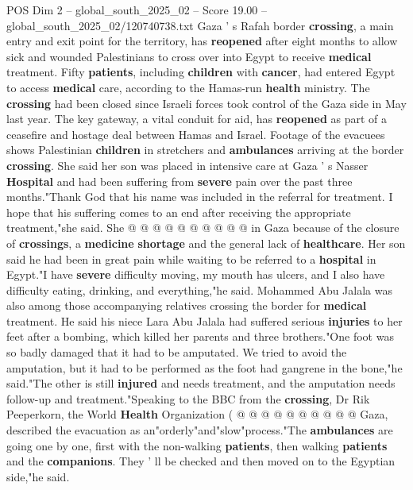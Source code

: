 \begin{textsample}{POS Dim 2 – global\_south\_2025\_02 – Score 19.00 – global\_south\_2025\_02/120740738.txt}  \label{ex:f2_pos_426}
Gaza ' s Rafah border \textbf{crossing}, a main entry and exit point for the territory, has \textbf{reopened} after eight months to allow sick and wounded Palestinians to cross over into Egypt to receive \textbf{medical} treatment.
Fifty \textbf{patients}, including \textbf{children} with \textbf{cancer}, had entered Egypt to access \textbf{medical} care, according to the Hamas-run \textbf{health} ministry.
The \textbf{crossing} had been closed since Israeli forces took control of the Gaza side in May last year.
The key gateway, a vital conduit for aid, has \textbf{reopened} as part of a ceasefire and hostage deal between Hamas and Israel.
Footage of the evacuees shows Palestinian \textbf{children} in stretchers and \textbf{ambulances} arriving at the border \textbf{crossing}.
She said her son was placed in intensive care at Gaza ' s Nasser \textbf{Hospital} and had been suffering from \textbf{severe} pain over the past three months."Thank God that his name was included in the referral for treatment.
I hope that his suffering comes to an end after receiving the appropriate treatment,"she said.
She @ @ @ @ @ @ @ @ @ @ in Gaza because of the closure of \textbf{crossings}, a \textbf{medicine} \textbf{shortage} and the general lack of \textbf{healthcare}.
Her son said he had been in great pain while waiting to be referred to a \textbf{hospital} in Egypt."I have \textbf{severe} difficulty moving, my mouth has ulcers, and I also have difficulty eating, drinking, and everything,"he said.
Mohammed Abu Jalala was also among those accompanying relatives crossing the border for \textbf{medical} treatment.
He said his niece Lara Abu Jalala had suffered serious \textbf{injuries} to her feet after a bombing, which killed her parents and three brothers."One foot was so badly damaged that it had to be amputated.
We tried to avoid the amputation, but it had to be performed as the foot had gangrene in the bone,"he said."The other is still \textbf{injured} and needs treatment, and the amputation needs follow-up and treatment."Speaking to the BBC from the \textbf{crossing}, Dr Rik Peeperkorn, the World \textbf{Health} Organization ( @ @ @ @ @ @ @ @ @ @ Gaza, described the evacuation as an"orderly"and"slow"process."The \textbf{ambulances} are going one by one, first with the non-walking \textbf{patients}, then walking \textbf{patients} and the \textbf{companions}.
They ' ll be checked and then moved on to the Egyptian side,"he said.

\end{textsample}
